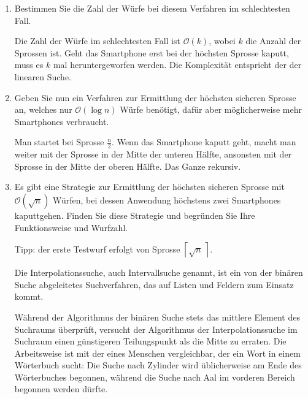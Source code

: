 \documentclass{bschlangaul-aufgabe}
\begin{document}
\begin{enumerate}


\item Bestimmen Sie die Zahl der Würfe bei diesem Verfahren im
schlechtesten Fall.

\begin{bAntwort}
Die Zahl der Würfe im schlechtesten Fall ist $\mathcal{O} (k)$, wobei
$k$ die Anzahl der Sprossen ist. Geht das Smartphone erst bei der
höchsten Sprosse kaputt, muss es $k$ mal heruntergeworfen werden. Die
Komplexität entspricht der der linearen Suche.
\end{bAntwort}


\item Geben Sie nun ein Verfahren zur Ermittlung der höchsten sicheren
Sprosse an, welches nur $\mathcal{O}(\log n)$ Würfe benötigt, dafür
aber möglicherweise mehr Smartphones verbraucht.

\begin{bAntwort}
Man startet bei Sprosse $\frac{n}{2}$. Wenn das Smartphone kaputt geht,
macht man weiter mit der Sprosse in der Mitte der unteren Hälfte,
ansonsten mit der Sprosse in der Mitte der oberen Hälfte. Das Ganze
rekursiv.
\end{bAntwort}


\item Es gibt eine Strategie zur Ermittlung der höchsten sicheren
Sprosse mit $\mathcal{O}\left(\sqrt{n}\right)$ Würfen, bei dessen Anwendung
höchstens zwei Smartphones kaputtgehen. Finden Sie diese Strategie und
begründen Sie Ihre Funktionsweise und Wurfzahl.

Tipp: der erste Testwurf erfolgt von Sprosse $\left\lceil\sqrt{n}\,\right\rceil$.

\begin{bExkurs}[Interpolationssuche]
Die Interpolationssuche, auch Intervallsuche genannt, ist ein von der
binären Suche abgeleitetes Suchverfahren, das auf Listen und Feldern zum
Einsatz kommt.

Während der Algorithmus der binären Suche stets das mittlere Element des
Suchraums überprüft, versucht der Algorithmus der Interpolationssuche im
Suchraum einen günstigeren Teilungspunkt als die Mitte zu erraten. Die
Arbeitsweise ist mit der eines Menschen vergleichbar, der ein Wort in
einem Wörterbuch sucht: Die Suche nach Zylinder wird üblicherweise am
Ende des Wörterbuches begonnen, während die Suche nach Aal im vorderen
Bereich begonnen werden dürfte.
\end{bExkurs}


\end{enumerate}
\end{document}

